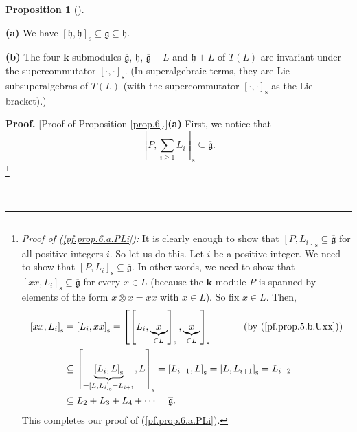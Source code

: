 \documentclass[numbers=enddot,12pt,final,onecolumn,notitlepage]{scrartcl}%
\theoremstyle{definition}
\newtheorem{prop}[theo]{Proposition}
\newenvironment{proposition}[1][]
{\begin{prop}[#1]\begin{leftbar}}
{\end{leftbar}\end{prop}}
\newenvironment{proof}[1][Proof]{\noindent\textbf{#1.} }{\ \rule{0.5em}{0.5em}}
\let\sumnonlimits\sum
\renewcommand{\sum}{\sumnonlimits\limits}
\begin{document}
\begin{proposition}
\label{prop.6}\textbf{(a)} We have $\left[  \mathfrak{h},\mathfrak{h}\right]
_{\operatorname*{s}}\subseteq\overline{\mathfrak{g}}\subseteq\mathfrak{h}$.
\medskip

\textbf{(b)} The four $\mathbf{k}$-submodules $\overline{\mathfrak{g}}$,
$\mathfrak{h}$, $\overline{\mathfrak{g}}+L$ and $\mathfrak{h}+L$ of $T\left(
L\right)  $ are invariant under the supercommutator $\left[  \cdot
,\cdot\right]  _{\operatorname*{s}}$. (In superalgebraic terms, they are Lie
subsuperalgebras of $T\left(  L\right)  $ (with the supercommutator $\left[
\cdot,\cdot\right]  _{\operatorname*{s}}$ as the Lie bracket).)
\end{proposition}

\begin{proof}
[Proof of Proposition \ref{prop.6}.]\textbf{(a)} First, we notice that%
\begin{equation}
\left[  P,\sum_{i\geq1}L_{i}\right]  _{\operatorname*{s}}\subseteq
\overline{\mathfrak{g}}. \label{pf.prop.6.a.PLi}%
\end{equation}
\footnote{\textit{Proof of (\ref{pf.prop.6.a.PLi}):} It is clearly enough to
show that $\left[  P,L_{i}\right]  _{\operatorname*{s}}\subseteq
\overline{\mathfrak{g}}$ for all positive integers $i$. So let us do this. Let
$i$ be a positive integer. We need to show that $\left[  P,L_{i}\right]
_{\operatorname*{s}}\subseteq\overline{\mathfrak{g}}$. In other words, we need
to show that $\left[  xx,L_{i}\right]  _{\operatorname*{s}}\subseteq
\overline{\mathfrak{g}}$ for every $x\in L$ (because the $\mathbf{k}$-module
$P$ is spanned by elements of the form $x\otimes x=xx$ with $x\in L$). So fix
$x\in L$. Then,%
\begin{align*}
\left[  xx,L_{i}\right]  _{\operatorname*{s}}  &  =\left[  L_{i},xx\right]
_{\operatorname*{s}}=\left[  \left[  L_{i},\underbrace{x}_{\in L}\right]
_{\operatorname*{s}},\underbrace{x}_{\in L}\right]  _{\operatorname*{s}%
}\ \ \ \ \ \ \ \ \ \ \left(  \text{by (\ref{pf.prop.5.b.Uxx})}\right) \\
&  \subseteq\left[  \underbrace{\left[  L_{i},L\right]  _{\operatorname*{s}}%
}_{=\left[  L,L_{i}\right]  _{\operatorname*{s}}=L_{i+1}},L\right]
_{\operatorname*{s}}=\left[  L_{i+1},L\right]  _{\operatorname*{s}}=\left[
L,L_{i+1}\right]  _{\operatorname*{s}}=L_{i+2}\\
&  \subseteq L_{2}+L_{3}+L_{4}+\cdots=\overline{\mathfrak{g}}.
\end{align*}
This completes our proof of (\ref{pf.prop.6.a.PLi}).}


\end{proof}
\end{document}
